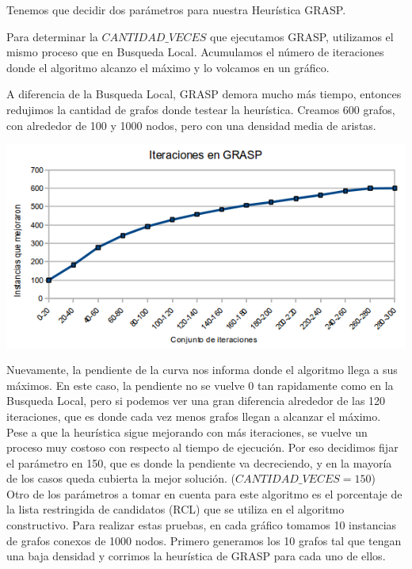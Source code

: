 \documentclass[a4paper, 10pt]{article}
\begin{document}
Tenemos que decidir dos par\'ametros para nuestra Heur\'istica GRASP.

Para determinar la $CANTIDAD\_VECES$ que ejecutamos GRASP, utilizamos el mismo proceso que en Busqueda Local.
Acumulamos el n\'umero de iteraciones donde el algoritmo alcanzo el m\'aximo y lo volcamos en un gr\'afico.

A diferencia de la Busqueda Local, GRASP demora mucho m\'as tiempo, entonces redujimos la cantidad de grafos donde testear la heur\'istica.
Creamos 600 grafos, con alrededor de 100 y 1000 nodos, pero con una densidad media de aristas. 

\begin{center}
	\includegraphics[scale=0.60]{Graficos/06-01.png}
\end{center}

Nuevamente, la pendiente de la curva nos informa donde el algoritmo llega a sus m\'aximos.
En este caso, la pendiente no se vuelve 0 tan rapidamente como en la Busqueda Local, pero si podemos ver una gran diferencia alrededor de las 120 iteraciones, que es donde cada vez menos grafos llegan a alcanzar el m\'aximo. \\
Pese a que la heur\'istica sigue mejorando con m\'as iteraciones, se vuelve un proceso muy costoso con respecto al tiempo de ejecuci\'on.
Por eso decidimos fijar el par\'ametro en 150, que es donde la pendiente va decreciendo, y en la mayor\'ia de los casos queda cubierta la mejor soluci\'on. ($CANTIDAD\_VECES = 150$) \\ 

Otro de los par\'ametros a tomar en cuenta para este algoritmo es el porcentaje de la lista restringida de candidatos (RCL) que se utiliza en el algoritmo constructivo. Para realizar estas pruebas, en cada gr\'afico tomamos 10 instancias de grafos conexos de 1000 nodos. Primero generamos los 10 grafos tal que tengan una baja densidad y corrimos la heur\'istica de GRASP para cada uno de ellos. \\
\end{document}
